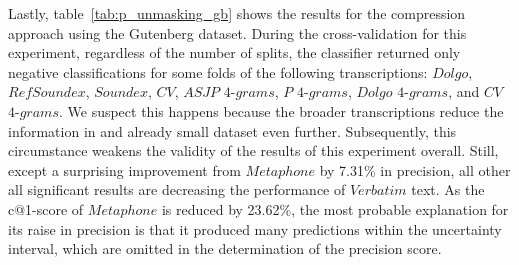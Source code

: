Lastly, table~\ref{tab:p_unmasking_gb} shows the results for the compression approach using the Gutenberg dataset.
During the cross-validation for this experiment, regardless of the number of splits, the classifier returned only negative classifications for some folds of the following transcriptions: $Dolgo$, $RefSoundex$, $Soundex$, $CV$, $ASJP$ $4$-$grams$, $P$ $4$-$grams$, $Dolgo$ $4$-$grams$, and $CV$ $4$-$grams$.
We suspect this happens because the broader transcriptions reduce the information in and already small dataset even further.
Subsequently, this circumstance weakens the validity of the results of this experiment overall.
Still, except a surprising improvement from $Metaphone$ by 7.31\% in precision, all other all significant results are decreasing the performance of $Verbatim$ text.
As the c@1-score of $Metaphone$ is reduced by 23.62\%, the most probable explanation for its raise in precision is that it produced many predictions within the uncertainty interval, which are omitted in the determination of the precision score.\\

